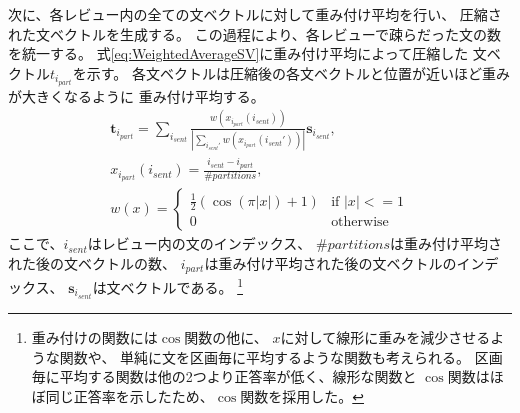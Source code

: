 \documentclass{ttithesis}
\begin{document}
次に、各レビュー内の全ての文ベクトルに対して重み付け平均を行い、
圧縮された文ベクトルを生成する。
この過程により、各レビューで疎らだった文の数を統一する。
式\ref{eq:WeightedAverageSV}に重み付け平均によって圧縮した
文ベクトル$t_{i_{part}}$を示す。
各文ベクトルは圧縮後の各文ベクトルと位置が近いほど重みが大きくなるように
重み付け平均する。
\begin{gather}
  \mathbf{t}_{i_{part}} = \sum_{i_{sent}}
                          \frac{w(x_{i_{part}}(i_{sent}))}
                               {|\sum_{i_{sent}'} w(x_{i_{part}}(i_{sent}'))|}
                          \mathbf{s}_{i_{sent}},
  \label{eq:WeightedAverageSV} \\
  x_{i_{part}}(i_{sent}) = \frac{i_{sent} - i_{part}}{\#partitions},
  \nonumber \\
  w(x) = \begin{cases}
    \frac{1}{2} (\cos(\pi|x|) + 1) &\text{if $|x| <= 1$} \\
    0 &\text{otherwise}
  \end{cases} \nonumber
\end{gather}
ここで、$i_{sent}$はレビュー内の文のインデックス、
$\#partitions$は重み付け平均された後の文ベクトルの数、
$i_{part}$は重み付け平均された後の文ベクトルのインデックス、
$\mathbf{s}_{i_{sent}}$は文ベクトルである。
\footnote{重み付けの関数には$\cos$関数の他に、
$x$に対して線形に重みを減少させるような関数や、
単純に文を区画毎に平均するような関数も考えられる。
区画毎に平均する関数は他の2つより正答率が低く、線形な関数と
$\cos$関数はほぼ同じ正答率を示したため、$\cos$関数を採用した。}
\end{document}
